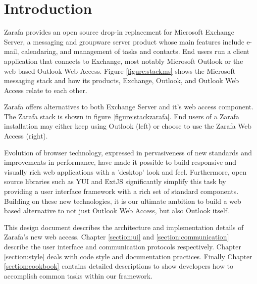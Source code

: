 \chapter{Introduction}

Zarafa provides an open source drop-in replacement for Microsoft Exchange Server, a messaging and groupware 
server product whose main features include e-mail, calendaring, and management of tasks and contacts. 
End users run a client application that connects to Exchange, most notably Microsoft Outlook or the web based
Outlook Web Access. Figure \ref{figure:stackms} shows the Microsoft messaging stack and how its products,
Exchange, Outlook, and Outlook Web Access relate to each other.

Zarafa offers alternatives to both Exchange Server and it's web access component. The Zarafa stack is 
shown in figure \ref{figure:stackzarafa}. End users of a Zarafa installation may either keep using 
Outlook (left) or choose to use the Zarafa Web Access (right). 

Evolution of browser technology, expressed in pervasiveness of new standards and improvements in
performance, have made it possible to build responsive and visually rich web applications with a 
'desktop' look and feel. Furthermore, open source libraries such as YUI and ExtJS significantly simplify
this task by providing a user interface framework with a rich set of standard components. 
Building on these new technologies, it is our ultimate ambition to build a web based alternative to 
not just Outlook Web Access, but also Outlook itself. 

This design document describes the architecture and implementation details of Zarafa's new web access.
Chapter \ref{section:ui} and \ref{section:communication} describe the user interface and communication 
protocols respectively. Chapter \ref{section:style} deals with code style and documentation practices.
Finally Chapter \ref{section:cookbook} contains detailed descriptions to show developers how to 
accomplish common tasks within our framework.

